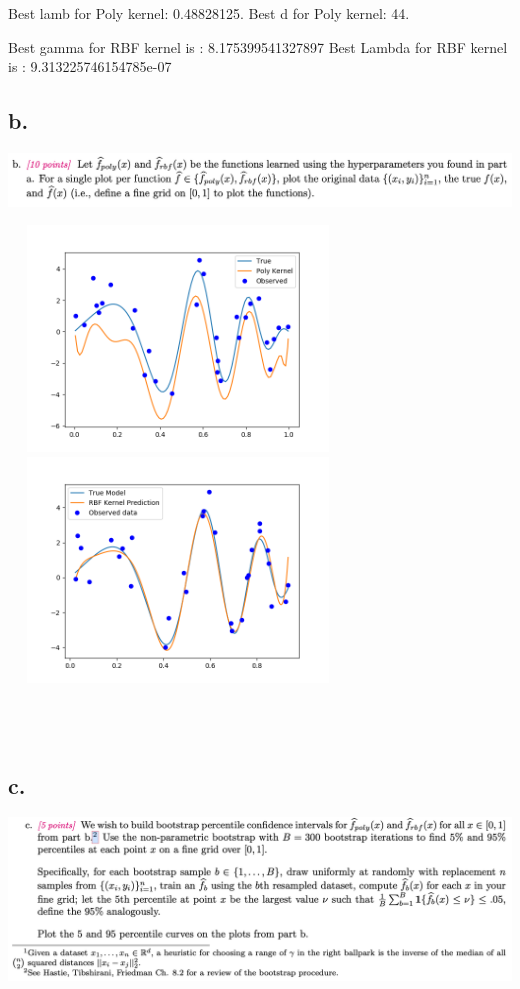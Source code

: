 \documentclass{article}
\begin{document}
Best lamb for Poly kernel:  0.48828125. \newline
Best d for Poly kernel:  44. \newline

Best gamma for RBF kernel is :  8.175399541327897 \newline
Best Lambda for RBF kernel is : 9.313225746154785e-07



\subsection*{b.}
\includegraphics[width=16cm]{img/A3b.png}

\includegraphics[width=9cm, height=6cm]{plots/A3b_1.png} 
\includegraphics[width=9cm, height=6cm]{plots/A3b_2.png} 

\begin{verbatim}



\end{verbatim}

\subsection*{c.}
\includegraphics[width=16cm]{img/A3c.png}
\end{document}
